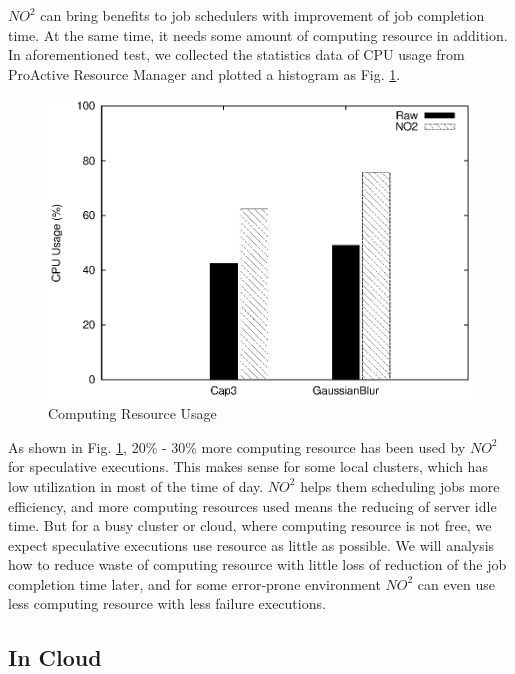 $NO^2$ can bring benefits to job schedulers with improvement of job completion time. At the same time, it needs some amount of computing resource in addition. In aforementioned test, we collected the statistics data of CPU usage from ProActive Resource Manager and plotted a histogram as Fig. \ref{figure:resourceusage}.

\begin{figure}
\centering
\includegraphics[width=0.9\columnwidth]{figures/resource_usage.eps}
\caption{Computing Resource Usage}
\label{figure:resourceusage}
\end{figure}

As shown in Fig. \ref{figure:resourceusage}, 20\% - 30\% more computing resource has been used by $NO^2$ for speculative executions. This makes sense for some local clusters, which has low utilization in most of the time of day. $NO^2$ helps them scheduling jobs more efficiency, and more computing resources used means the reducing of server idle time. But for a busy cluster or cloud, where computing resource is not free, we expect speculative executions use resource as little as possible. We will analysis how to reduce waste of computing resource with little loss of reduction of the job completion time later, and for some error-prone environment $NO^2$ can even use less computing resource with less failure executions.

\subsection{In Cloud}

